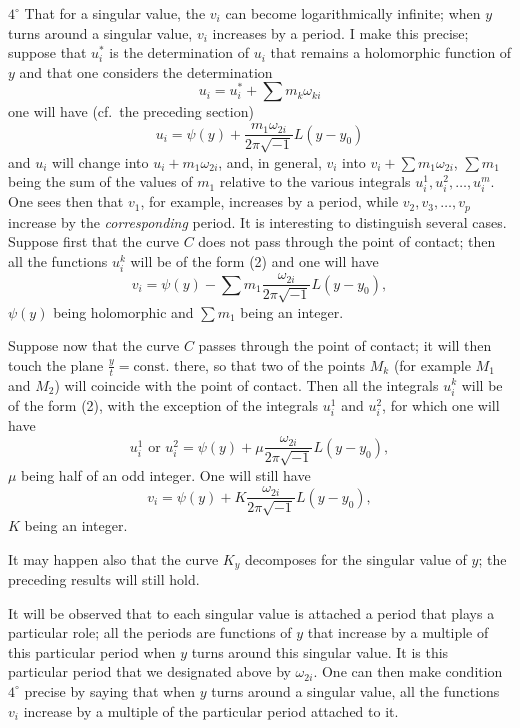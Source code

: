\documentclass{article}
\begin{document}
$4^{\circ}$ That for a singular value, the $v_{i}$ can become logarithmically infinite; when $y$ turns around a singular value, $v_{i}$ increases by a period. I make this precise; suppose that $u_{i}^{*}$ is the determination of $u_{i}$ that remains a holomorphic function of $y$ and that one considers the determination
\[
u_{i} = u_{i}^{*} + \sum m_{k} \omega_{ki}
\]
one will have (cf.~the preceding section)
\[
u_{i} = \psi(y) + \frac{m_{1}\omega_{2i}}{2\pi\sqrt{-1}} L(y - y_{0}) \tag{2}
\]
and $u_{i}$ will change into $u_{i} + m_{1}\omega_{2i}$, and, in general, $v_{i}$ into $v_{i} + \displaystyle\sum m_{1}\omega_{2i}$, $\displaystyle\sum m_{1}$ being the sum of the values of $m_{1}$ relative to the various integrals $u_{i}^{1}, u_{i}^{2}, \ldots, u_{i}^{m}$. One sees then that $v_{1}$, for example, increases by a period, while $v_{2}, v_{3}, \ldots, v_{p}$ increase by the \emph{corresponding} period.
It is interesting to distinguish several cases. Suppose first that the curve $C$ does not pass through the point of contact; then all the functions $u_{i}^{k}$ will be of the form (2) and one will have
\[
v_{i} = \psi(y) - \sum m_{1} \frac{\omega_{2i}}{2\pi\sqrt{-1}} L(y - y_{0}),
\]
$\psi(y)$ being holomorphic and $\displaystyle\sum m_{1}$ being an integer.

Suppose now that the curve $C$ passes through the point of contact; it will then touch the plane $\frac{y}{t} = \text{const.}$ there, so that two of the points $M_{k}$ (for example $M_{1}$ and $M_{2}$) will coincide with the point of contact. Then all the integrals $u_{i}^{k}$ will be of the form (2), with the exception of the integrals $u_{i}^{1}$ and $u_{i}^{2}$, for which one will have
\[
u_{i}^{1} \text{ or } u_{i}^{2} = \psi(y) + \mu \frac{\omega_{2i}}{2\pi\sqrt{-1}} L(y - y_{0}),
\]
$\mu$ being half of an odd integer. One will still have
\[
v_{i} = \psi(y) + K \frac{\omega_{2i}}{2\pi\sqrt{-1}} L(y - y_{0}),
\]
$K$ being an integer.

It may happen also that the curve $K_{y}$ decomposes for the singular value of $y$; the preceding results will still hold.

It will be observed that to each singular value is attached a period that plays a particular role; all the periods are functions of $y$ that increase by a multiple of this particular period when $y$ turns around this singular value. It is this particular period that we designated above by $\omega_{2i}$. One can then make condition $4^{\circ}$ precise by saying that when $y$ turns around a singular value, all the functions $v_{i}$ increase by a multiple of the particular period attached to it.
\end{document}
